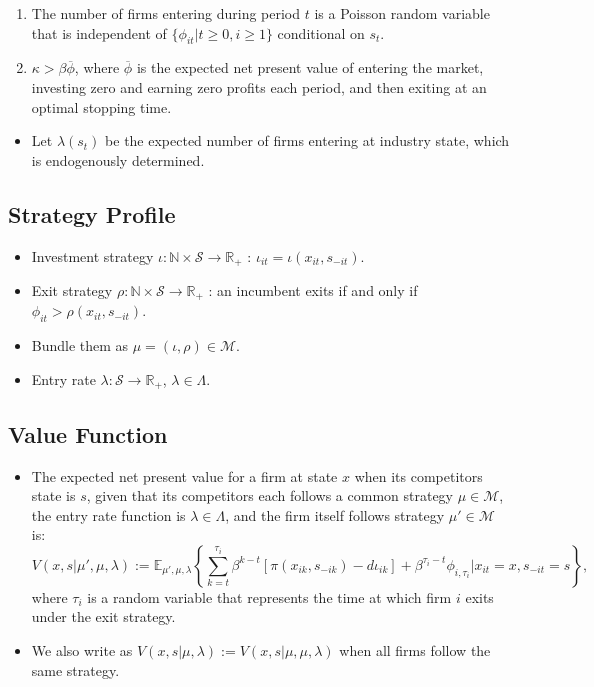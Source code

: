 \documentclass[]{book}
\providecommand{\tightlist}{%
  \setlength{\itemsep}{0pt}\setlength{\parskip}{0pt}}
\begin{document}
\begin{enumerate}
\def\labelenumi{\arabic{enumi}.}
\tightlist
\item
  The number of firms entering during period \(t\) is a Poisson random
  variable that is independent of \(\{\phi_{it}| t \ge 0, i \ge 1\}\)
  conditional on \(s_t\).
\item
  \(\kappa > \beta \overline{\phi}\), where \(\overline{\phi}\) is the
  expected net present value of entering the market, investing zero and
  earning zero profits each period, and then exiting at an optimal
  stopping time.
\end{enumerate}

\begin{itemize}
\tightlist
\item
  Let \(\lambda(s_t)\) be the expected number of firms entering at
  industry state, which is endogenously determined.
\end{itemize}

\subsection{Strategy Profile}\label{strategy-profile}

\begin{itemize}
\tightlist
\item
  Investment strategy
  \(\iota: \mathbb{N} \times \mathcal{S} \to \mathbb{R}_+\) :
  \(\iota_{it} = \iota(x_{it}, s_{-it})\).
\item
  Exit strategy \(\rho: \mathbb{N} \times \mathcal{S} \to \mathbb{R}_+\)
  : an incumbent exits if and only if
  \(\phi_{it} > \rho(x_{it}, s_{-it})\).
\item
  Bundle them as \(\mu = (\iota, \rho) \in \mathcal{M}\).
\item
  Entry rate \(\lambda: \mathcal{S} \to \mathbb{R}_+\),
  \(\lambda \in \Lambda\).
\end{itemize}

\subsection{Value Function}\label{value-function}

\begin{itemize}
\tightlist
\item
  The expected net present value for a firm at state \(x\) when its
  competitors state is \(s\), given that its competitors each follows a
  common strategy \(\mu \in \mathcal{M}\), the entry rate function is
  \(\lambda \in \Lambda\), and the firm itself follows strategy
  \(\mu' \in \mathcal{M}\) is: \[
  V(x, s|\mu', \mu, \lambda) := \mathbb{E}_{\mu', \mu, \lambda}\left\{\sum_{k = t}^{\tau_i} \beta^{k - t}[\pi(x_{ik}, s_{-ik}) - d \iota_{ik}] + \beta^{\tau_i - t} \phi_{i, \tau_i}|x_{it} = x, s_{-it} = s\right\},
  \] where \(\tau_i\) is a random variable that represents the time at
  which firm \(i\) exits under the exit strategy.
\item
  We also write as \(V(x, s|\mu, \lambda) := V(x, s|\mu, \mu, \lambda)\)
  when all firms follow the same strategy.
\end{itemize}
\end{document}
